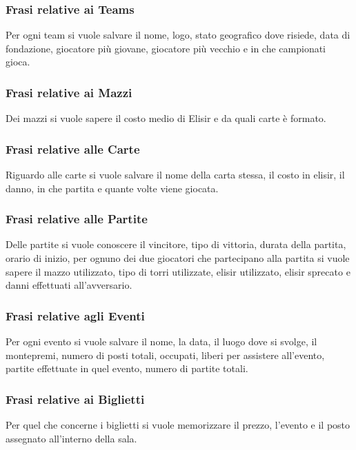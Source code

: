 \documentclass{article}
\begin{document}
\subsubsection{Frasi relative ai Teams}

Per ogni team si vuole salvare il nome, logo, stato geografico dove risiede, data di fondazione, giocatore più giovane, giocatore più vecchio e in che campionati gioca.

\subsubsection{Frasi relative ai Mazzi}

Dei mazzi si vuole sapere il costo medio di Elisir e da quali carte è formato.

\subsubsection{Frasi relative alle Carte}

Riguardo alle carte si vuole salvare il nome della carta stessa, il costo in elisir, il danno, in che partita e quante volte viene giocata.

\subsubsection{Frasi relative alle Partite}

Delle partite si vuole conoscere il vincitore, tipo di vittoria, durata della partita, orario di inizio, per ognuno dei due giocatori che partecipano alla partita si vuole sapere il mazzo utilizzato, tipo di torri utilizzate, elisir utilizzato, elisir sprecato e danni effettuati all'avversario.

\subsubsection{Frasi relative agli Eventi}

Per ogni evento si vuole salvare il nome, la data, il luogo dove si svolge, il montepremi, numero di posti totali, occupati, liberi per assistere all'evento, partite effettuate in quel evento, numero di partite totali.

\subsubsection{Frasi relative ai Biglietti}

Per quel che concerne i biglietti si vuole memorizzare il prezzo, l'evento e il posto assegnato all'interno della sala.
\end{document}
